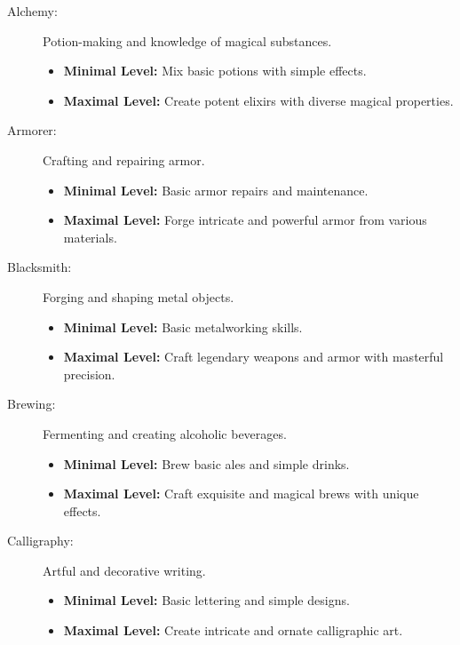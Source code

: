\documentclass[12pt]{book}
\begin{document}
\begin{description}

    \item[Alchemy:] Potion-making and knowledge of magical substances.
        \begin{itemize}
            \item \textbf{Minimal Level:} Mix basic potions with simple effects.
            \item \textbf{Maximal Level:} Create potent elixirs with diverse magical properties.
        \end{itemize}

    \item[Armorer:] Crafting and repairing armor.
        \begin{itemize}
            \item \textbf{Minimal Level:} Basic armor repairs and maintenance.
            \item \textbf{Maximal Level:} Forge intricate and powerful armor from various materials.
        \end{itemize}

    \item[Blacksmith:] Forging and shaping metal objects.
        \begin{itemize}
            \item \textbf{Minimal Level:} Basic metalworking skills.
            \item \textbf{Maximal Level:} Craft legendary weapons and armor with masterful precision.
        \end{itemize}

    \item[Brewing:] Fermenting and creating alcoholic beverages.
        \begin{itemize}
            \item \textbf{Minimal Level:} Brew basic ales and simple drinks.
            \item \textbf{Maximal Level:} Craft exquisite and magical brews with unique effects.
        \end{itemize}

    \item[Calligraphy:] Artful and decorative writing.
        \begin{itemize}
            \item \textbf{Minimal Level:} Basic lettering and simple designs.
            \item \textbf{Maximal Level:} Create intricate and ornate calligraphic art.
        \end{itemize}


\end{description}
\end{document}
